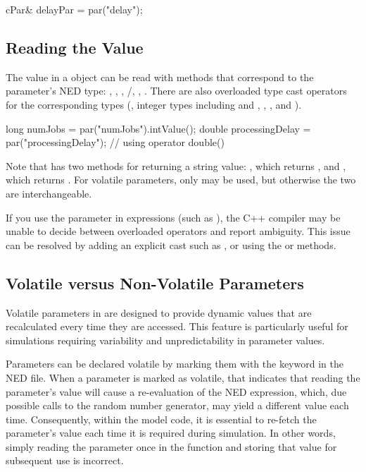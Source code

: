 \begin{cpp}
cPar& delayPar = par("delay");
\end{cpp}


\subsection{Reading the Value}
\label{sec:simple-modules:parameters-reading}

The value in a  object can be read with methods that correspond
to the parameter's NED type: , ,
, /,
, .
There are also overloaded type cast operators for the corresponding types
(, integer types including  and ,
, ,  and ).

\begin{cpp}
long numJobs = par("numJobs").intValue();
double processingDelay = par("processingDelay"); // using operator double()
\end{cpp}

Note that  has two methods for returning a string value:
, which returns , and
, which returns .
For volatile parameters, only  may be used,
but otherwise the two are interchangeable.

If you use the  parameter in expressions (such as
), the C++ compiler may be unable to decide
between overloaded operators and report ambiguity. This issue can be
resolved by adding an explicit cast such as ,
or using the  or  methods.


\subsection{Volatile versus Non-Volatile Parameters}
\label{sec:simple-modules:volatile-parameters}

Volatile parameters in {\omnetpp} are designed to provide dynamic values that are
recalculated every time they are accessed. This feature is particularly useful
for simulations requiring variability and unpredictability in parameter values.

Parameters can be declared volatile by marking them with the 
keyword in the NED file. When a parameter is marked as volatile, that indicates
that reading the parameter's value will cause a re-evaluation of the NED
expression, which, due possible calls to the random number generator, may yield
a different value each time. Consequently, within the model code, it is
essential to re-fetch the parameter's value each time it is required during
simulation. In other words, simply reading the parameter once in the
 function and storing that value for subsequent use is
incorrect.

